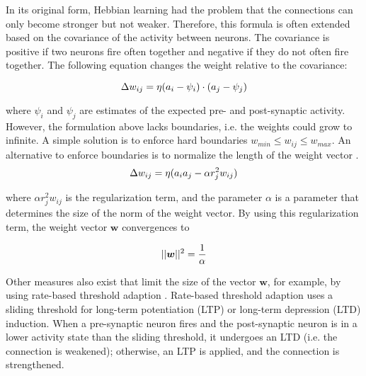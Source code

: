 In its original form, Hebbian learning had the problem that the connections can only become stronger but not weaker.
Therefore, this formula is often extended based on the covariance of the activity between neurons.
The covariance is positive if two neurons fire often together and negative if they do not often fire together.
The following equation changes the weight relative to the covariance:

\begin{equation}\eqlbl{hebb_2}
	\Delta w_{ij} = \eta (a_i - \psi_i) \cdot (a_j - \psi_j)
\end{equation}

where \(\psi_i\) and \(\psi_j\) are estimates of the expected pre- and post-synaptic activity.
However, the formulation above lacks boundaries, i.e. the weights could grow to infinite.
A simple solution is to enforce hard boundaries \(w_{min} \leq w_{ij} \leq w_{max}\).
An alternative to enforce boundaries is to normalize the length of the weight vector .
\begin{equation}\eqlbl{hebb_3}
	\Delta w_{ij} = \eta (a_i a_j - \alpha r^2_j w_{ij})
\end{equation}

where $\alpha r^2_j w_{ij}$ is the regularization term, and the parameter \(\alpha\) is a parameter that determines the size of the norm of the weight vector.
By using this regularization term, the weight vector $\boldsymbol{w}$ convergences to

\begin{equation}\eqlbl{hebb_31}
	||\boldsymbol{w}||^2 = \frac{1}{\alpha}
\end{equation}

Other measures also exist that limit the size of the vector $\boldsymbol{w}$, for example, by using rate-based threshold adaption . Rate-based threshold adaption uses a sliding threshold for long-term potentiation (LTP) or long-term depression (LTD) induction.
When a pre-synaptic neuron fires and the post-synaptic neuron is in a lower activity state than the sliding threshold, it undergoes an LTD (i.e. the connection is weakened); otherwise, an LTP is applied, and the connection is strengthened.   

